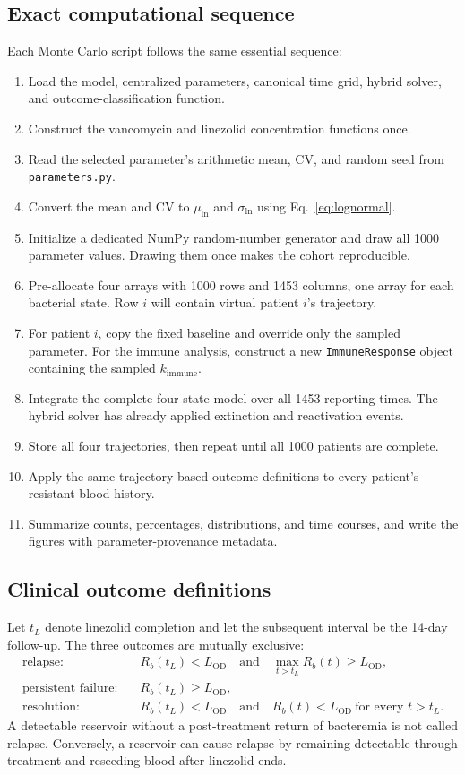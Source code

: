 \documentclass[11pt]{article}
\newcommand{\KI}{k_{\mathrm{immune}}}
\newcommand{\LOD}{L_{\mathrm{OD}}}
\begin{document}
\subsection{Exact computational sequence}

Each Monte Carlo script follows the same essential sequence:
\begin{enumerate}
\item Load the model, centralized parameters, canonical time grid, hybrid
solver, and outcome-classification function.
\item Construct the vancomycin and linezolid concentration functions once.
\item Read the selected parameter's arithmetic mean, CV, and random seed from
\texttt{parameters.py}.
\item Convert the mean and CV to $\mu_{\ln}$ and $\sigma_{\ln}$ using
Eq.~\eqref{eq:lognormal}.
\item Initialize a dedicated NumPy random-number generator and draw all 1000
parameter values. Drawing them once makes the cohort reproducible.
\item Pre-allocate four arrays with 1000 rows and 1453 columns, one array for
each bacterial state. Row $i$ will contain virtual patient $i$'s trajectory.
\item For patient $i$, copy the fixed baseline and override only the sampled
parameter. For the immune analysis, construct a new
\texttt{ImmuneResponse} object containing the sampled $\KI$.
\item Integrate the complete four-state model over all 1453 reporting times.
The hybrid solver has already applied extinction and reactivation events.
\item Store all four trajectories, then repeat until all 1000 patients are
complete.
\item Apply the same trajectory-based outcome definitions to every patient's
resistant-blood history.
\item Summarize counts, percentages, distributions, and time courses, and
write the figures with parameter-provenance metadata.
\end{enumerate}

\subsection{Clinical outcome definitions}

Let $t_L$ denote linezolid completion and let the subsequent interval be the
14-day follow-up. The three outcomes are mutually exclusive:
\begin{align}
\text{relapse}:\quad &R_b(t_L)<\LOD
\quad\text{and}\quad \max_{t>t_L}R_b(t)\geq\LOD,\\
\text{persistent failure}:\quad &R_b(t_L)\geq\LOD,\\
\text{resolution}:\quad &R_b(t_L)<\LOD
\quad\text{and}\quad R_b(t)<\LOD\ \text{for every }t>t_L.
\end{align}
A detectable reservoir without a post-treatment return of bacteremia is not
called relapse. Conversely, a reservoir can cause relapse by remaining
detectable through treatment and reseeding blood after linezolid ends.
\end{document}
